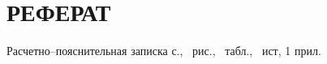\part*{РЕФЕРАТ}

Расчетно--пояснительная записка \pageref{LastPage} с., \totalfigures\ рис., \totaltables\ табл., \thetotalbibentries\ ист, 1 прил.
